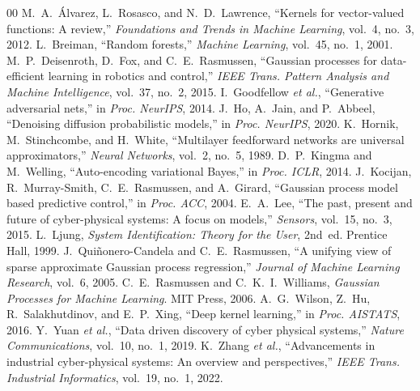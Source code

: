 \documentclass[conference]{IEEEtran}
\begin{document}
\begin{thebibliography}{00}
 M.~A.~\'Alvarez, L.~Rosasco, and N.~D.~Lawrence, ``Kernels for vector-valued functions: A review,'' \textit{Foundations and Trends in Machine Learning}, vol.~4, no.~3, 2012.
 L.~Breiman, ``Random forests,'' \textit{Machine Learning}, vol.~45, no.~1, 2001.
 M.~P.~Deisenroth, D.~Fox, and C.~E.~Rasmussen, ``Gaussian processes for data-efficient learning in robotics and control,'' \textit{IEEE Trans. Pattern Analysis and Machine Intelligence}, vol.~37, no.~2, 2015.
 I.~Goodfellow \textit{et al.}, ``Generative adversarial nets,'' in \textit{Proc. NeurIPS}, 2014.
 J.~Ho, A.~Jain, and P.~Abbeel, ``Denoising diffusion probabilistic models,'' in \textit{Proc. NeurIPS}, 2020.
 K.~Hornik, M.~Stinchcombe, and H.~White, ``Multilayer feedforward networks are universal approximators,'' \textit{Neural Networks}, vol.~2, no.~5, 1989.
 D.~P.~Kingma and M.~Welling, ``Auto-encoding variational Bayes,'' in \textit{Proc. ICLR}, 2014.
 J.~Kocijan, R.~Murray-Smith, C.~E.~Rasmussen, and A.~Girard, ``Gaussian process model based predictive control,'' in \textit{Proc. ACC}, 2004.
 E.~A.~Lee, ``The past, present and future of cyber-physical systems: A focus on models,'' \textit{Sensors}, vol.~15, no.~3, 2015.
 L.~Ljung, \textit{System Identification: Theory for the User}, 2nd~ed. Prentice Hall, 1999.
 J.~Qui\~nonero-Candela and C.~E.~Rasmussen, ``A unifying view of sparse approximate Gaussian process regression,'' \textit{Journal of Machine Learning Research}, vol.~6, 2005.
 C.~E.~Rasmussen and C.~K.~I.~Williams, \textit{Gaussian Processes for Machine Learning}. MIT Press, 2006.
 A.~G.~Wilson, Z.~Hu, R.~Salakhutdinov, and E.~P.~Xing, ``Deep kernel learning,'' in \textit{Proc. AISTATS}, 2016.
 Y.~Yuan \textit{et al.}, ``Data driven discovery of cyber physical systems,'' \textit{Nature Communications}, vol.~10, no.~1, 2019.
 K.~Zhang \textit{et al.}, ``Advancements in industrial cyber-physical systems: An overview and perspectives,'' \textit{IEEE Trans. Industrial Informatics}, vol.~19, no.~1, 2022.
\end{thebibliography}
\end{document}
